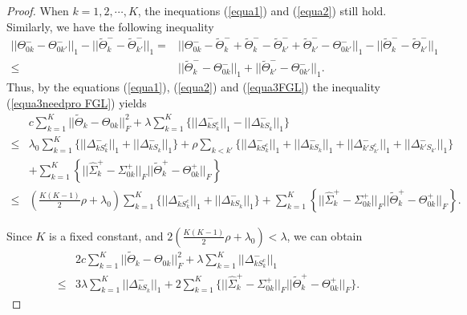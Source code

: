 \documentclass[review]{elsarticle}
\newcommand{\1}{{\bf 1}}
\newcommand{\0}{{\bf 0}}
\newtheorem{proof}{Proof}
\begin{document}
\begin{appendices}
\begin{proof}
 When $k=1,2,\cdots,K$, the inequations (\ref{equa1}) and (\ref{equa2}) still hold. Similarly, we have the following inequality
\begin{equation}\label{equa3FGL}
\begin{split}
||\Theta_{0k}^{-}-\Theta_{0k'}^{-}||_1-||\widetilde{\Theta}_k^{-}-\widetilde{\Theta}_{k'}^{-}||_1
=&||\Theta_{0k}^{-}-\widetilde{\Theta}_k^{-}+\widetilde{\Theta}_k^{-}-\widetilde{\Theta}_{k'}^{-}
+\widetilde{\Theta}_{k'}^{-}
-\Theta_{0k'}^{-}||_1-||\widetilde{\Theta}_k^{-}-\widetilde{\Theta}_{k'}^{-}||_1\\
\leq& ||\widetilde{\Theta}_k^{-}-\Theta_{0k}^{-}||_1+||\widetilde{\Theta}_{k'}^{-}
-\Theta_{0k'}^{-}||_1.
\end{split}
\end{equation}
Thus, by the equations (\ref{equa1}), (\ref{equa2}) and (\ref{equa3FGL}) the inequality (\ref{equa3needpro FGL}) yields
\begin{equation}
\begin{split}
&c\sum_{k=1}^{K}||\widetilde{\Theta}_k-\Theta_{0k}||_{F}^{2}
+\lambda\sum_{k=1}^{K}\Big\{||\Delta_{kS_k^{c}}^{-}||_1-||\Delta_{kS_k}^{-}||_1\Big\}\\
\leq &\lambda_0\sum_{k=1}^{K}\Big\{||\Delta_{kS_k^{c}}^{-}||_1+||\Delta_{kS_k}^{-}||_1\Big\}
+\rho\sum_{k<k'}\Big\{||\Delta_{kS_k^{c}}^{-}||_1+||\Delta_{kS_k}^{-}||_1+||\Delta_{k'S_{k'}^{c}}^{-}||_1+||\Delta_{k'S_{k'}}^{-}||_1\Big\}\\
&+\sum_{k=1}^{K}\left\{||\widehat{\Sigma}_{k}^{+}-\Sigma_{0k}^{+}||_F||\widetilde{\Theta}_k^{+}-\Theta_{0k}^{+}||_{F}\right\}\\
\leq &\left(\frac{K(K-1)}{2}\rho+\lambda_0\right)\sum_{k=1}^{K}\Big\{||\Delta_{kS_k^{c}}^{-}||_1+||\Delta_{kS_k}^{-}||_1\Big\}
+\sum_{k=1}^{K}\left\{||\widehat{\Sigma}_{k}^{+}-\Sigma_{0k}^{+}||_F||\widetilde{\Theta}_k^{+}-\Theta_{0k}^{+}||_{F}\right\}.
\end{split}
\end{equation}

 Since $K$ is a fixed constant, and $2(\frac{K(K-1)}{2}\rho+\lambda_0)<\lambda$, we can obtain
\begin{equation}
\begin{split}
&2c\sum_{k=1}^{K}||\widetilde{\Theta}_k-\Theta_{0k}||_{F}^{2}
+\lambda\sum_{k=1}^{K}||\Delta_{kS_k^{c}}^{-}||_1\\
\leq &3\lambda\sum_{k=1}^{K}||\Delta_{kS_k}^{-}||_1
+2\sum_{k=1}^{K}\Big\{||\widehat{\Sigma}_{k}^{+}-\Sigma_{0k}^{+}||_F||\widetilde{\Theta}_k^{+}-\Theta_{0k}^{+}||_{F}\Big\}.
\end{split}
\end{equation}



\end{proof}
\end{appendices}
\end{document}
